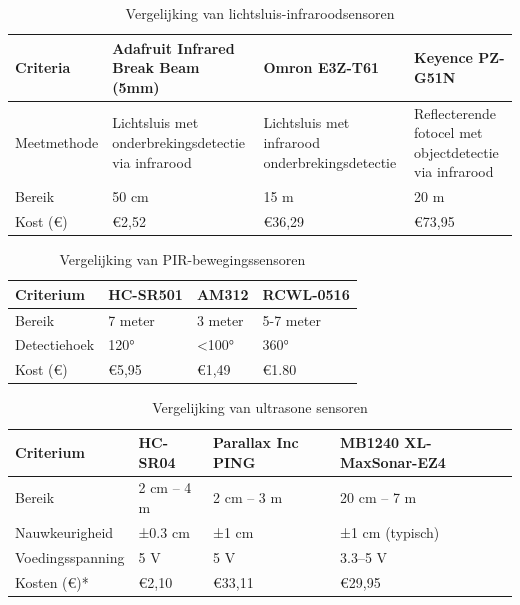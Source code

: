 \begin{table}[h!]
    \small
    \caption{Vergelijking van lichtsluis-infraroodsensoren \autocite{Industries2024, Omron2024, KEYENCE}}
    \begin{tabular}{|p{3cm}|p{4cm}|p{3.5cm}|p{3.5cm}|} %
        \hline
        \textbf{Criteria} & \textbf{Adafruit Infrared Break Beam (5mm)} & \textbf{Omron E3Z-T61} & \textbf{Keyence PZ-G51N} \\
        \hline
        Meetmethode & Lichtsluis met onderbrekingsdetectie via infrarood & Lichtsluis met infrarood onderbrekingsdetectie & Reflecterende fotocel met objectdetectie via infrarood \\
        \hline
        Bereik & 50 cm & 15 m & 20 m \\
        \hline
        Kost (€) & €2,52 & €36,29 & €73,95 \\
        \hline
    \end{tabular}
\end{table}

\begin{table}[h!]
    \small
    \caption{Vergelijking van PIR-bewegingssensoren \autocite{LastMinuteEngineersa, HobbyComponents, LastMinuteEngineers}}
    \label{tab:vergelijking-thermische-camera}
    \begin{tabular}{|p{4cm}|p{3.5cm}|p{3.5cm}|p{3cm}|}
        \hline
        \textbf{Criterium} & \textbf{HC-SR501} & \textbf{AM312} & \textbf{RCWL-0516} \\
        \hline
        Bereik & 7 meter & 3 meter & 5-7 meter \\
        \hline
        Detectiehoek & 120° & <100° & 360° \\
        \hline
        Kost (€) & €5,95 & €1,49 & €1.80 \\
        \hline
    \end{tabular}
\end{table}
\clearpage

\begin{table}[h!]
    \small
    \caption{Vergelijking van ultrasone sensoren \autocite{HCSR04datasheet, ParallaxPING, MB1240datasheet}}
    \label{tab:vergelijking-ultrasoonsensoren}
    \begin{tabular}{|p{3.5cm}|p{3cm}|p{3.5cm}|p{4cm}|}
        \hline
        \textbf{Criterium} & \textbf{HC-SR04} & \textbf{Parallax Inc PING}} & \textbf{MB1240 XL-MaxSonar-EZ4} \\
    \hline
    Bereik & 2 cm – 4 m & 2 cm – 3 m & 20 cm – 7 m \\
    \hline
    Nauwkeurigheid & ±0.3 cm & ±1 cm & ±1 cm (typisch) \\
    \hline
    Voedingsspanning & 5 V & 5 V & 3.3–5 V \\
    \hline
    Kosten (€)* & €2,10 & €33,11 & €29,95 \\
    \hline
\end{tabular}
\end{table}



